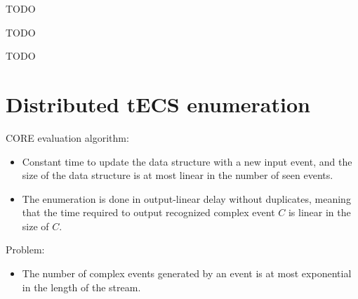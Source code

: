 
\begin{lemma}[TODO]
  \label{lemma:todo}
  TODO
\end{lemma}

\begin{theorem}[TODO]
  \label{theorem:todo}
  TODO
\end{theorem}

\begin{example}[TODO]
  \label{example:todo}
  TODO
\end{example}

%
%


\newpage
\section{Distributed tECS enumeration}\label{sec:distributed_tecs_enumeration}

CORE evaluation algorithm:

\begin{itemize}
  \item Constant time to update the data structure with a new input event, and the size of the data structure is at most linear in the number of seen events.
  \item The enumeration is done in output-linear delay without duplicates, meaning that the time required to output recognized complex event $C$ is linear in the size of $C$.
\end{itemize}

Problem:

\begin{itemize}
  \item The number of complex events generated by an event is at most exponential in the length of the stream.
\end{itemize}

